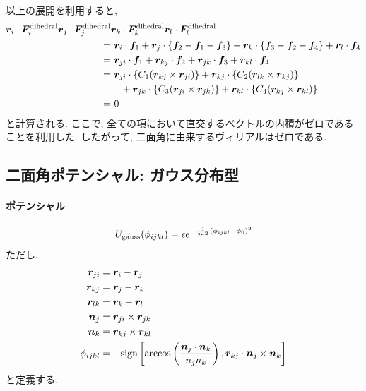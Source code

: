 以上の展開を利用すると, 
\begin{align}
    \bm{r}_{i} \cdot \bm{F}_{i}^{\mathrm{dihedral}}
    \bm{r}_{j} \cdot \bm{F}_{j}^{\mathrm{dihedral}}
 &  \bm{r}_{k} \cdot \bm{F}_{k}^{\mathrm{dihedral}}
    \bm{r}_{l} \cdot \bm{F}_{l}^{\mathrm{dihedral}}
 \notag
 \\
 =&~
    \bm{r}_{i} \cdot \bm{f}_{1}
   +\bm{r}_{j} \cdot \{\bm{f}_{2} - \bm{f}_{1} - \bm{f}_{3}\}
   +\bm{r}_{k} \cdot \{\bm{f}_{3} - \bm{f}_{2} - \bm{f}_{4}\}
   +\bm{r}_{l} \cdot \bm{f}_{4}
 \notag
 \\
 =&~
    \bm{r}_{ji} \cdot \bm{f}_{1}
   +\bm{r}_{kj} \cdot \bm{f}_{2}
   +\bm{r}_{jk} \cdot \bm{f}_{3}
   +\bm{r}_{kl} \cdot \bm{f}_{4}
 \notag
 \\
 =&~
    \bm{r}_{ji} \cdot \{ C_{1} (\bm{r}_{kj} \times \bm{r}_{ji}) \}
   +\bm{r}_{kj} \cdot \{ C_{2} (\bm{r}_{lk} \times \bm{r}_{kj}) \}
 \notag
 \\
   &~~~
   +\bm{r}_{jk} \cdot \{ C_{3} (\bm{r}_{ji} \times \bm{r}_{jk}) \}
   +\bm{r}_{kl} \cdot \{ C_{4} (\bm{r}_{kj} \times \bm{r}_{kl}) \}
 \notag
 \\
 =&~
   0
 \notag
\end{align}
と計算される. ここで, 全ての項において直交するベクトルの内積がゼロであることを利用した. 
したがって, 二面角に由来するヴィリアルはゼロである. 

\clearpage
\subsection{二面角ポテンシャル: ガウス分布型}
\paragraph{ポテンシャル}
\begin{equation}
   U_{\mathrm{gauss}} (\phi_{ijkl})
   =
   \epsilon
   e^{-\frac{1}{2\sigma^{2}}(\phi_{ijkl} - \phi_{0})^{2}}
   \notag
\end{equation}
ただし, 
\begin{alignat}{1}
 \bm{r}_{ji} &= \bm{r}_{i} - \bm{r}_{j}
 \notag \\
 \bm{r}_{kj} &= \bm{r}_{j} - \bm{r}_{k}
 \notag \\
 \bm{r}_{lk} &= \bm{r}_{k} - \bm{r}_{l}
 \notag \\
 \bm{n}_{j}  &= \bm{r}_{ji} \times \bm{r}_{jk}
 \notag \\
 \bm{n}_{k}  &= \bm{r}_{kj} \times \bm{r}_{kl}
 \notag
 \\
 \phi_{ijkl} &=
 - \mathrm{sign}
   \left[
         \arccos \left( \frac{\bm{n}_{j} \cdot \bm{n}_{k}}{n_{j} n_{k}}\right),
         \bm{r}_{kj} \cdot \bm{n}_{j} \times \bm{n}_{k}
   \right]
 \notag
\end{alignat}
と定義する.

